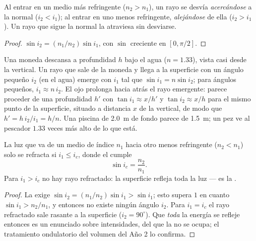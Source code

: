 \begin{proposition}\label{prop:b1:rays-reflection-refraction:bending}
Al entrar en un medio más refringente ($n_2 > n_1$), un rayo se desvía
\emph{acercándose} a la normal ($i_2 < i_1$); al entrar en uno menos
refringente, \emph{alejándose} de ella ($i_2 > i_1$). Un rayo que sigue la
normal la atraviesa sin desviarse.
\end{proposition}

\begin{proof}
$\sin i_2 = (n_1/n_2)\sin i_1$, con $\sin$ creciente en
$[0, \pi/2]$.
\end{proof}

\begin{example}\label{ex:b1:rays-reflection-refraction:depth}
Una moneda descansa a profundidad $h$ bajo el agua ($n = 1.33$), vista
casi desde la vertical. Un rayo que sale de la moneda y llega a la
superficie con un ángulo pequeño $i_2$ (en el agua) emerge con $i_1$ tal
que $\sin i_1 = n\sin i_2$; para ángulos pequeños, $i_1 \approx n\,i_2$. El
ojo prolonga hacia atrás el rayo emergente: parece proceder de una
profundidad $h'$ con $\tan i_1 \approx x/h'$ y $\tan i_2 \approx x/h$ para
el mismo punto de la superficie, situado a distancia $x$ de la vertical,
de modo que $h' = h\,i_2/i_1 = h/n$. Una piscina de \qty{2.0}{m} de fondo
parece de \qty{1.5}{m}; un pez ve al pescador $1.33$ veces más alto de lo
que está.
\end{example}

\begin{theorem}\label{thm:b1:rays-reflection-refraction:tir}
La luz que va de un medio de índice $n_1$ hacia otro menos refringente
($n_2 < n_1$) solo se refracta si $i_1 \leq i_c$, donde el
\emph{} cumple
\[
\sin i_c = \frac{n_2}{n_1} .
\]
Para $i_1 > i_c$ no hay rayo refractado: la superficie refleja toda la
luz --- es la \emph{}.
\end{theorem}

\begin{proof}
La  exige $\sin i_2 = (n_1/n_2)\sin i_1 > \sin i_1$; esto
supera $1$ en cuanto $\sin i_1 > n_2/n_1$, y entonces no existe ningún
ángulo $i_2$. Para $i_1 = i_c$ el rayo refractado sale rasante a la
superficie ($i_2 = 90^\circ$). Que \emph{toda} la energía se refleje
entonces es un enunciado sobre intensidades, del que la 
no se ocupa; el tratamiento ondulatorio del volumen del Año 2 lo confirma.
\end{proof}

